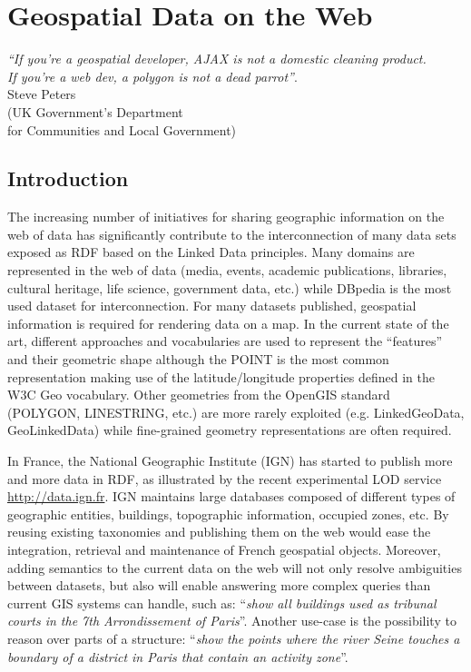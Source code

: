 \chapter{Geospatial Data on the Web}
\label{ch:ch1}

\begin{flushright}
\textit{``If you're a geospatial developer, AJAX is not a domestic cleaning product. \\
If you're a web dev, a polygon is not a dead parrot''}.\\
Steve Peters \\
(UK Government's Department \\for Communities and Local Government) 

\end{flushright}

 
\section{Introduction}
The increasing number of initiatives for sharing geographic information on the web of data has significantly contribute to the interconnection of many data sets exposed as RDF based on the Linked Data principles. Many domains are represented in the web of data (media, events, academic publications, libraries, cultural heritage, life science, government data, etc.) while DBpedia is the most used dataset for interconnection. For many datasets published, geospatial information is required for rendering data on a map. In the current state of the art, different approaches and vocabularies are used to represent the ``features'' and their geometric shape although the POINT is the most common representation making use of the latitude/longitude properties defined in the W3C Geo vocabulary. Other geometries from the OpenGIS standard (POLYGON, LINESTRING, etc.) are more rarely exploited (e.g. LinkedGeoData, GeoLinkedData) while fine-grained geometry representations are often required.

In France, the National Geographic Institute (IGN) has started to publish more and more data in RDF, as illustrated by the recent experimental LOD service \url{http://data.ign.fr}. IGN maintains large databases composed of different types of geographic entities, buildings, topographic information, occupied zones, etc. By reusing existing taxonomies and publishing them on the web would ease the integration, retrieval and maintenance of French geospatial objects. Moreover, adding semantics to the current data on the web will not only resolve ambiguities between datasets, but also will enable answering more complex queries than current GIS systems can handle, such as: ``\emph{show all buildings used as tribunal courts in the 7th Arrondissement of Paris}''. Another use-case is the possibility to reason over parts of a structure: ``\emph{show the points where the river Seine touches a boundary of a district in Paris that contain an activity zone}''.

